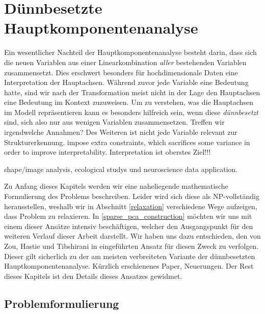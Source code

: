 \chapter{Dünnbesetzte Hauptkomponentenanalyse}

\label{sparse_pca}

Ein wesentlicher Nachteil der Hauptkomponentenanalyse besteht darin, dass sich die neuen Variablen aus einer Linearkombination \textit{aller} bestehenden Variablen zusammensetzt. Dies erschwert besonders für hochdimensionale Daten eine Interpretation der Hauptachsen. Während zuvor jede Variable eine Bedeutung hatte, sind wir nach der Transformation meist nicht in der Lage den Hauptachsen eine Bedeutung im Kontext zuzuweisen. Um zu verstehen, was die Hauptachsen im Modell repräsentieren kann es besonders hilfreich sein, wenn diese \textit{dünnbesetzt} sind, sich also nur aus wenigen Variablen zusammensetzen. Treffen wir irgendwelche Annahmen? Des Weiteren ist nicht jede Variable relevant zur Strukturerkennung. impose extra constraints, which sacrifices some variance in order to improve interpretability. Interpretation ist oberstes Ziel!!!

shape/image analysis, ecological studys und neuroscience data application.

Zu Anfang dieses Kapitels werden wir eine naheliegende mathematische Formulierung des Problems beschreiben. Leider wird sich diese als NP-vollständig herausstellen, weshalb wir in Abschnitt \ref{relaxation} verschiedene Wege aufzeigen, dass Problem zu relaxieren. In \ref{sparse_pca_construction} möchten wir uns mit einem dieser Ansätze intensiv beschäftigen, welcher den Ausgangspunkt für den weiteren Verlauf dieser Arbeit darstellt. Wir haben uns dazu entschieden, den von Zou, Hastie und Tibshirani in \cite{zou_sparsepca} eingeführten Ansatz für diesen Zweck zu verfolgen. Dieser gilt sicherlich zu der am meisten verbreiteten Variante der dünnbesetzten Hauptkomponentenanalyse. Kürzlich erschienenes Paper, Neuerungen. Der Rest dieses Kapitels ist den Details dieses Ansatzes gewidmet.




\section{Problemformulierung}
\label{problem_formulation}


